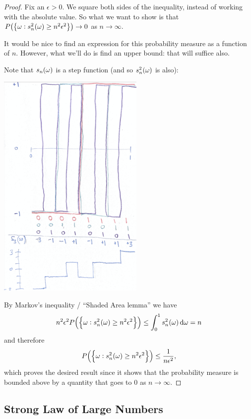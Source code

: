 \begin{proof}
  Fix an $\epsilon > 0$. We square both sides of the inequality, instead of working with the absolute value. So
  what we want to show is that $P\big(\big\{\omega: s_n^2(\omega) \geq n^2\epsilon^2\big\}\big) \to 0$
  as $n \to \infty$.

  It would be nice to find an expression for this probability measure as a function of $n$. However, what we'll
  do is find an upper bound: that will suffice also.

  Note that $s_n(\omega)$ is a step function (and so $s_n^2(\omega)$ is also):

\includegraphics[width=200pt]{img/analysis--real-analysis--measure-theory--weak-law-of-large-numbers-c049.png}


By Markov's inequality / ``Shaded Area lemma​'' we have
\begin{align*}
  n^2\epsilon^2P\Big(\Big\{\om: s_n^2(\om) \geq n^2\epsilon^2\Big\}\Big) \leq \int_0^1 s_n^2(\om) \d\om = n
\end{align*}
and therefore
\begin{align*}
  P\Big(\Big\{\omega: s_n^2(\omega) \geq n^2\epsilon^2\Big\}\Big) \leq  \frac{1}{n\epsilon^2},
\end{align*}
which proves the desired result since it shows that the probability measure is bounded above by a quantity that
goes to $0$ as $n \to \infty$.
\end{proof}

\subsection{Strong Law of Large Numbers}

